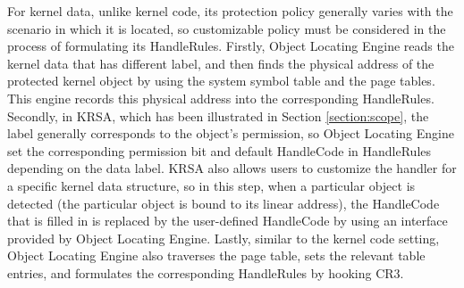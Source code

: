 \documentclass[conference]{IEEEtran}
\begin{document}
For kernel data, unlike kernel code, its protection policy generally varies with the scenario in which it is located, so customizable policy must be considered in the process of formulating its HandleRules. Firstly, Object Locating Engine reads the kernel data that has different label, and then finds the physical address of the protected kernel object by using the system symbol table and the page tables. This engine records this physical address into the corresponding HandleRules. Secondly, in KRSA, which has been illustrated in Section \ref{section:scope}, the label generally corresponds to the object's permission, so Object Locating Engine set the corresponding permission bit and default HandleCode in HandleRules depending on the data label. KRSA also allows users to customize the handler for a specific kernel data structure, so in this step, when a particular object is detected (the particular object is bound to its linear address), the HandleCode that is filled in is replaced by the user-defined HandleCode by using an interface provided by Object Locating Engine. Lastly, similar to the kernel code setting, Object Locating Engine also traverses the page table, sets the relevant table entries, and formulates the corresponding HandleRules by hooking CR3. 

\end{document}

